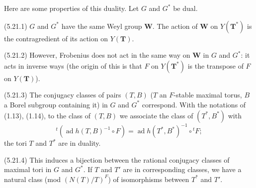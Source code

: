 \documentclass[9pt,twoside]{extarticle}
\begin{document}
{Here are some properties of this duality. Let \(G\) and \(G^*\) be dual.\par

(5.21.1) \(G\) and \(G^*\) have the same Weyl group \(\mathbf W\). The action of \(\mathbf W\) on \(Y(\mathbf T^*)\) is the contragredient of its action on \(Y(\mathbf T)\).\par

(5.21.2) However, Frobenius does not act in the same way on \(\mathbf W\) in \(G\) and \(G^*\): it acts in inverse ways (the origin of this is that \(F\) on \(Y(\mathbf T^*)\) is the transpose of \(F\) on \(Y(\mathbf T)\)).\par

(5.21.3) The conjugacy classes of pairs \((T,B)\) (\(T\) an \(F\)-stable maximal torus, \(B\) a Borel subgroup containing it) in \(G\) and \(G^*\) correspond. With the notations of (1.13), (1.14), to the class of \((T,B)\) we associate the class of \((T^*,B^*)\) with \[
{}^t(\operatorname{ad}h(T,B)^{-1}\circ F)
=
\operatorname{ad}h(T^*,B^*)^{-1}\circ{}^tF;
\] the tori \(T\) and \(T^*\) are in duality.\par

(5.21.4) This induces a bijection between the rational conjugacy classes of maximal tori in \(G\) and \(G^*\). If \(T\) and \(T'\) are in corresponding classes, we have a natural class (mod \((N(T)/T)^F\)) of isomorphisms between \(T^*\) and \(T'\).\par
}
\end{document}
